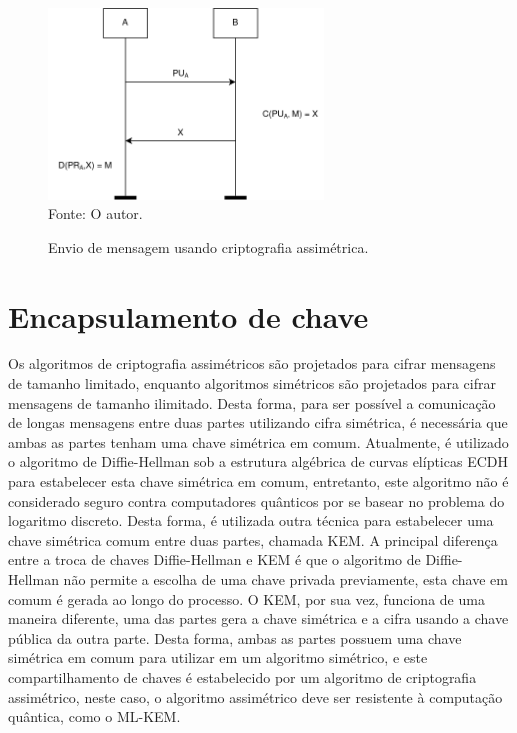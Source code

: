     \begin{figure}[htb!]
        \centering
        \caption{Envio de mensagem usando criptografia assimétrica.}
        \includegraphics[width=0.65\textwidth]{Figuras/assimetrica.png}\\
        \footnotesize{Fonte: O autor.}
        \label{fig:assimetrica}
    \end{figure}

\section{Encapsulamento de chave}
\label{sec:kem}
    Os algoritmos de criptografia assimétricos são projetados para cifrar mensagens de tamanho limitado, enquanto algoritmos simétricos são projetados para cifrar mensagens de tamanho ilimitado. Desta forma, para ser possível a comunicação de longas mensagens entre duas partes utilizando cifra simétrica, é necessária que ambas as partes tenham uma chave simétrica em comum. Atualmente, é utilizado o algoritmo de Diffie-Hellman sob a estrutura algébrica de curvas elípticas \ac{ECDH} para estabelecer esta chave simétrica em comum, entretanto, este algoritmo não é considerado seguro contra computadores quânticos por se basear no problema do logaritmo discreto. Desta forma, é utilizada outra técnica para estabelecer uma chave simétrica comum entre duas partes, chamada \ac{KEM}. A principal diferença entre a troca de chaves Diffie-Hellman e \ac{KEM} é que o algoritmo de Diffie-Hellman não permite a escolha de uma chave privada previamente, esta chave em comum é gerada ao longo do processo. O \ac{KEM}, por sua vez, funciona de uma maneira diferente, uma das partes gera a chave simétrica e a cifra usando a chave pública da outra parte. Desta forma, ambas as partes possuem uma chave simétrica em comum para utilizar em um algoritmo simétrico, e este compartilhamento de chaves é estabelecido por um algoritmo de criptografia assimétrico, neste caso, o algoritmo assimétrico deve ser resistente à computação quântica, como o \ac{ML-KEM}.

